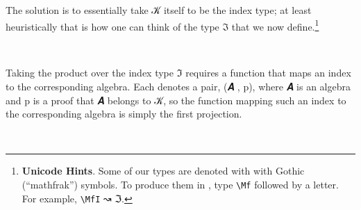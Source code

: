 The solution is to essentially take \ab 𝒦 itself to be the index type; at least heuristically that is how one can think of the type \af ℑ that we now define.\footnote{\textbf{Unicode Hints}. Some of our types are denoted with with Gothic (``mathfrak'') symbols. To produce them in \agdamode, type \texttt{\textbackslash{}Mf} followed by a letter. For example, \texttt{\textbackslash{}MfI} ↝ \af ℑ.}
\ccpad
\begin{code}%
\>[0][@{}l@{\AgdaIndent{0}}]%
\>[1]\AgdaSpace{}%
\AgdaSymbol{:}\AgdaSpace{}%
\AgdaSpace{}%
\AgdaSpace{}%
\<%
\\
%
\>[1]\AgdaSpace{}%
\AgdaSymbol{=}\AgdaSpace{}%
\AgdaSpace{}%
\AgdaSpace{}%
\AgdaSpace{}%
\AgdaSymbol{(}\AgdaSpace{}%
\AgdaSpace{}%
\AgdaSymbol{)}\AgdaSpace{}%
\AgdaFunction{,}\AgdaSpace{}%
\AgdaSymbol{(}\AgdaSpace{}%
\AgdaSpace{}%
\AgdaSymbol{)}\<%
\end{code}
\ccpad
Taking the product over the index type \af ℑ requires a function that maps an index  to the corresponding algebra.  Each  denotes a pair, (\ab 𝑨 , \ab p), where \ab 𝑨 is an algebra and \ab p is a proof that \ab 𝑨 belongs to \ab 𝒦, so the function mapping such an index to the corresponding algebra is simply the first projection.
\ccpad
\begin{code}
\>[0][@{}l@{\AgdaIndent{0}}]%
\>[1]\AgdaSpace{}%
\AgdaSymbol{:}\AgdaSpace{}%
\AgdaSpace{}%
\AgdaSpace{}%
\AgdaSpace{}%
\AgdaSpace{}%
\<%
\\
%
\>[1]\AgdaSpace{}%
\AgdaSymbol{=}\AgdaSpace{}%
\AgdaSpace{}%
\AgdaSymbol{(}\AgdaSpace{}%
\AgdaSymbol{:}\AgdaSpace{}%
\AgdaSymbol{)}\AgdaSpace{}%
\AgdaSpace{}%
\AgdaSpace{}%
\AgdaSpace{}%
\<%
\end{code}
